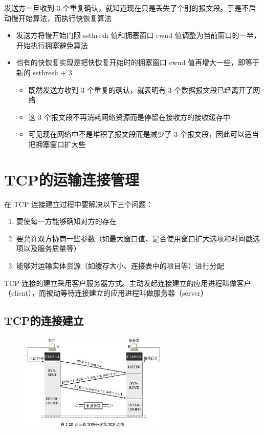 \documentclass[cs4size,a4paper,10pt]{ctexart}
\begin{document}
	发送方一旦收到 3 个重复确认，就知道现在只是丢失了个别的报文段。于是不启动慢开始算法，而执行快恢复算法
	\begin{itemize}
		\item 发送方将慢开始门限 ssthresh 值和拥塞窗口 cwnd 值调整为当前窗口的一半，开始执行拥塞避免算法
		\item 也有的快恢复实现是把快恢复开始时的拥塞窗口 cwnd 值再增大一些，即等于新的 ssthresh + 3
		\begin{itemize}
			\item 既然发送方收到 3 个重复的确认，就表明有 3 个数据报文段已经离开了网络
			\item 这 3 个报文段不再消耗网络资源而是停留在接收方的接收缓存中
			\item 可见现在网络中不是堆积了报文段而是减少了 3 个报文段，因此可以适当把拥塞窗口扩大些
		\end{itemize}
	\end{itemize}

	\section{TCP的运输连接管理}
	在 TCP 连接建立过程中要解决以下三个问题：
	\begin{enumerate}[label=\arabic*.]
		\item 要使每一方能够确知对方的存在
		\item 要允许双方协商一些参数（如最大窗口值、是否使用窗口扩大选项和时间戳选项以及服务质量等）
		\item 能够对运输实体资源（如缓存大小、连接表中的项目等）进行分配
	\end{enumerate}

	TCP 连接的建立采用客户服务器方式。主动发起连接建立的应用进程叫做客户（client），而被动等待连接建立的应用进程叫做服务器（server）

	\subsection{TCP的连接建立}
	\begin{figure}[H]
		\centering
		\includegraphics[width=0.65\textwidth]{img/5.28}
	\end{figure}
\end{document}
